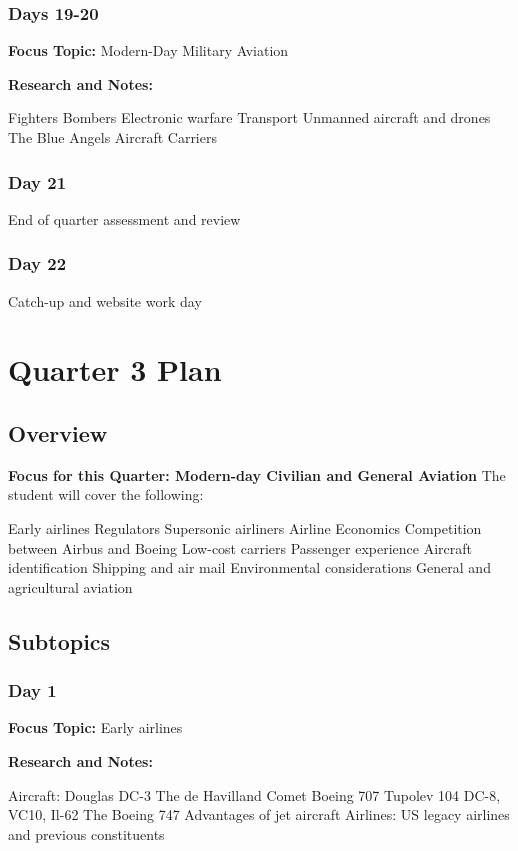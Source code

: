 \documentclass[12pt]{article}
\begin{document}
\subsubsection{Days 19-20}
\textbf{Focus Topic:} Modern-Day Military Aviation

\textbf{Research and Notes:}
\begin{outline}
    \1 Fighters
\1 Bombers
\1 Electronic warfare
\1 Transport
\1 Unmanned aircraft and drones
\1 The Blue Angels
\1 Aircraft Carriers
\end{outline}
\subsubsection{Day 21}
End of quarter assessment and review

\subsubsection{Day 22}
Catch-up and website work day

\section{Quarter 3 Plan}
\subsection{Overview}
\textbf{Focus for this Quarter: Modern-day Civilian and General Aviation}
The student will cover the following:
\begin{outline}
    \1 Early airlines
\1 Regulators
\1 Supersonic airliners
\1 Airline Economics
\2 Competition between Airbus and Boeing
\2 Low-cost carriers
\1 Passenger experience
\1 Aircraft identification
\1 Shipping and air mail
\1 Environmental considerations
\1 General and agricultural aviation
\end{outline}
\subsection{Subtopics}
\subsubsection{Day 1}
\textbf{Focus Topic:} Early airlines

\textbf{Research and Notes:}
\begin{outline}
    \1 Aircraft:
\2 Douglas DC-3
\2 The de Havilland Comet
\2 Boeing 707
\2 Tupolev 104
\2 DC-8, VC10, Il-62
\2 The Boeing 747
\2 Advantages of jet aircraft
\1 Airlines:
\2 US legacy airlines and previous constituents
\end{outline}
\end{document}
